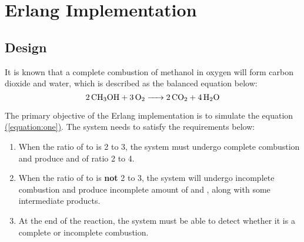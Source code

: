 \documentclass[12pt, a4paper]{article}
\begin{document}
\section{Erlang Implementation}
\subsection{Design} \label{sec:design}
It is known that a complete combustion of methanol in oxygen will form carbon dioxide and water,
which is described as the balanced equation below:
\begin{equation}
  \ce{2CH3OH + 3O2 -> 2CO_2 + 4H_2O} \label{equation:one}
\end{equation}

The primary objective of the Erlang implementation is to simulate the equation
\hyperref[equation:one]{(\ref*{equation:one})}. The system needs to satisfy the requirements below:
\begin{enumerate}
  \item When the ratio of  to  is 2 to 3, the system must undergo complete
  combustion and produce  and  of ratio 2 to 4.
  \item When the ratio of  to  is \textbf{not} 2 to 3, the system will undergo
  incomplete combustion and produce incomplete amount of  and , along with some
  intermediate products.
  \item At the end of the reaction, the system must be able to detect whether it is a complete or
  incomplete combustion.
\end{enumerate}
\end{document}
